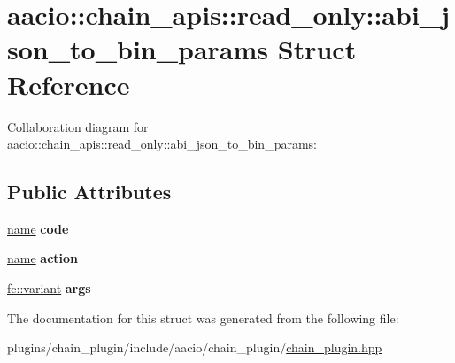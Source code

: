 \hypertarget{structaacio_1_1chain__apis_1_1read__only_1_1abi__json__to__bin__params}{}\section{aacio\+:\+:chain\+\_\+apis\+:\+:read\+\_\+only\+:\+:abi\+\_\+json\+\_\+to\+\_\+bin\+\_\+params Struct Reference}
\label{structaacio_1_1chain__apis_1_1read__only_1_1abi__json__to__bin__params}


Collaboration diagram for aacio\+:\+:chain\+\_\+apis\+:\+:read\+\_\+only\+:\+:abi\+\_\+json\+\_\+to\+\_\+bin\+\_\+params\+:
\subsection*{Public Attributes}
\begin{DoxyCompactItemize}
\item 
\mbox{\label{structaacio_1_1chain__apis_1_1read__only_1_1abi__json__to__bin__params_a0fd9341ccb7fc1f37c1f0ab48503c255}} 
\mbox{\hyperlink{structaacio_1_1name}{name}} {\bfseries code}
\item 
\mbox{\label{structaacio_1_1chain__apis_1_1read__only_1_1abi__json__to__bin__params_ab7d3ea5c75b4324ef4f34e85cc89b82b}} 
\mbox{\hyperlink{structaacio_1_1name}{name}} {\bfseries action}
\item 
\mbox{\label{structaacio_1_1chain__apis_1_1read__only_1_1abi__json__to__bin__params_a87a60cd2dfb7f03c38d88430a6fc4a27}} 
\mbox{\hyperlink{classfc_1_1variant}{fc\+::variant}} {\bfseries args}
\end{DoxyCompactItemize}


The documentation for this struct was generated from the following file\+:\begin{DoxyCompactItemize}
\item 
plugins/chain\+\_\+plugin/include/aacio/chain\+\_\+plugin/\mbox{\hyperlink{chain__plugin_8hpp}{chain\+\_\+plugin.\+hpp}}\end{DoxyCompactItemize}
